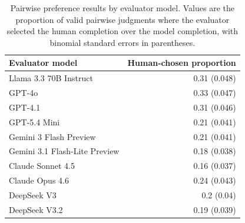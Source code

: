 \begin{table}[h]
\centering
\small
\begin{tabular}{lr}
\toprule
Evaluator model & Human-chosen proportion \\
\midrule
Llama 3.3 70B Instruct & 0.31 (0.048) \\
GPT-4o & 0.33 (0.047) \\
GPT-4.1 & 0.31 (0.046) \\
GPT-5.4 Mini & 0.21 (0.041) \\
Gemini 3 Flash Preview & 0.21 (0.041) \\
Gemini 3.1 Flash-Lite Preview & 0.18 (0.038) \\
Claude Sonnet 4.5 & 0.16 (0.037) \\
Claude Opus 4.6 & 0.24 (0.043) \\
DeepSeek V3 & 0.2 (0.04) \\
DeepSeek V3.2 & 0.19 (0.039) \\
\bottomrule
\end{tabular}
\caption{Pairwise preference results by evaluator model. Values are the proportion of valid pairwise judgments where the evaluator selected the human completion over the model completion, with binomial standard errors in parentheses.}
\label{tab:llm_preference_table}
\end{table}
